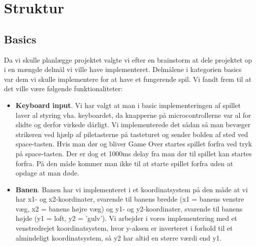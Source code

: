 \chapter{Struktur}

\section{Basics}
Da vi skulle planlægge projektet valgte vi efter en brainstorm at dele projektet op i en mængde delmål vi ville have implementeret. Delmålene i kategorien basics var dem vi skulle implementere for at have et fungerende spil. Vi fandt frem til at det ville være følgende funktionaliteter:
\begin{itemize}

\item \textbf{Keyboard input}. Vi har valgt at man i basic implementeringen af spillet laver al styring vha. keyboardet, da knapperne på microcontrollerne var al for slidte og derfor virkede dårligt. Vi implementerede det sådan så man bevæger strikeren ved hjælp af piletasterne på tasteturet og sender bolden af sted ved space-tasten. Hvis man dør og bliver Game Over startes spillet forfra ved tryk på space-tasten. Der er dog et 1000ms delay fra man dør til spillet kan startes forfra. På den måde kommer man ikke til at starte spillet forfra uden at opdage at man døde.

\item \textbf{Banen}. Banen har vi implementeret i et koordinatsystem på den måde at vi har  x1- og x2-koordinater, svarende til banens bredde (x1 = banens venstre væg, x2 = banens højre væg) og y1- og y2-koordinater, svarende til banens højde (y1 = loft, y2 = 'gulv'). Vi arbejder i vores implementering med et venstredrejet koordinatsystem, hvor y-aksen er inverteret i forhold til et almindeligt koordinatsystem, så y2 har altid en større værdi end y1.


\end{itemize}
